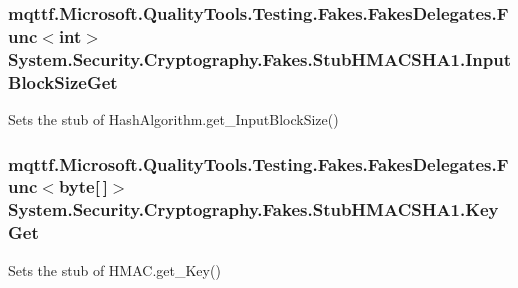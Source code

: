 \hypertarget{class_system_1_1_security_1_1_cryptography_1_1_fakes_1_1_stub_h_m_a_c_s_h_a1_a49c636dfb1a005a5f874b0fd2b5bcc14}{
\subsubsection[{Input\-Block\-Size\-Get}]{\setlength{\rightskip}{0pt plus 5cm}mqttf.\-Microsoft.\-Quality\-Tools.\-Testing.\-Fakes.\-Fakes\-Delegates.\-Func$<$int$>$ System.\-Security.\-Cryptography.\-Fakes.\-Stub\-H\-M\-A\-C\-S\-H\-A1.\-Input\-Block\-Size\-Get}}\label{class_system_1_1_security_1_1_cryptography_1_1_fakes_1_1_stub_h_m_a_c_s_h_a1_a49c636dfb1a005a5f874b0fd2b5bcc14}


Sets the stub of Hash\-Algorithm.\-get\-\_\-\-Input\-Block\-Size()

\hypertarget{class_system_1_1_security_1_1_cryptography_1_1_fakes_1_1_stub_h_m_a_c_s_h_a1_a9815f4cbdf9a309f475f2789a31356ae}{
\subsubsection[{Key\-Get}]{\setlength{\rightskip}{0pt plus 5cm}mqttf.\-Microsoft.\-Quality\-Tools.\-Testing.\-Fakes.\-Fakes\-Delegates.\-Func$<$byte\mbox{[}$\,$\mbox{]}$>$ System.\-Security.\-Cryptography.\-Fakes.\-Stub\-H\-M\-A\-C\-S\-H\-A1.\-Key\-Get}}\label{class_system_1_1_security_1_1_cryptography_1_1_fakes_1_1_stub_h_m_a_c_s_h_a1_a9815f4cbdf9a309f475f2789a31356ae}


Sets the stub of H\-M\-A\-C.\-get\-\_\-\-Key()


